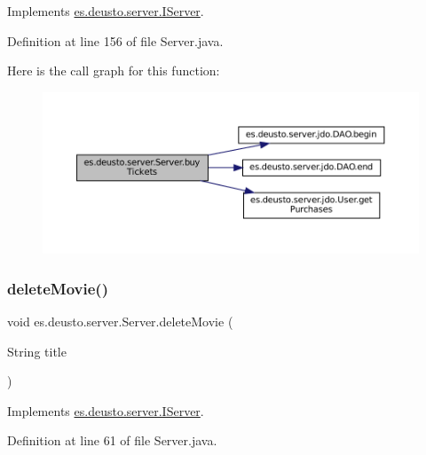 Implements \mbox{\hyperlink{interfacees_1_1deusto_1_1server_1_1_i_server_ac3302c01fefc37a32c0bcbf79fcce44b}{es.\+deusto.\+server.\+I\+Server}}.



Definition at line 156 of file Server.\+java.

Here is the call graph for this function\+:
\nopagebreak
\begin{figure}[H]
\begin{center}
\leavevmode
\includegraphics[width=350pt]{classes_1_1deusto_1_1server_1_1_server_a3bbf9f19774d2fae5c831cfac1f2306c_cgraph}
\end{center}
\end{figure}
\mbox{\label{classes_1_1deusto_1_1server_1_1_server_a6501e4103fcc2ef691c15e4e02f7136c}} 
\subsubsection{\texorpdfstring{deleteMovie()}{deleteMovie()}}
{\footnotesize\ttfamily void es.\+deusto.\+server.\+Server.\+delete\+Movie (\begin{DoxyParamCaption}\item[{String}]{title }\end{DoxyParamCaption})}



Implements \mbox{\hyperlink{interfacees_1_1deusto_1_1server_1_1_i_server_a0b3243dc04d49f7659fefec4e4fb43b7}{es.\+deusto.\+server.\+I\+Server}}.



Definition at line 61 of file Server.\+java.


